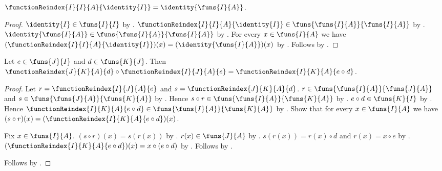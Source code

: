 \begin{theorem}\label{function_reindex_identity}
    $\functionReindex{I}{I}{A}{\identity{I}}=\identity{\funs{I}{A}}$.
\end{theorem}
\begin{proof}
    $\identity{I}\in\funs{I}{I}$ by .
    $\functionReindex{I}{I}{A}{\identity{I}}\in\funs{\funs{I}{A}}{\funs{I}{A}}$
        by .
    $\identity{\funs{I}{A}}\in\funs{\funs{I}{A}}{\funs{I}{A}}$ by
        .
    For every $x\in\funs{I}{A}$ we have
        $(\functionReindex{I}{I}{A}{\identity{I}})(x)
            =(\identity{\funs{I}{A}})(x)$ by
        .
    Follows by .
\end{proof}

\begin{theorem}\label{function_reindex_composition}
    Let $e\in\funs{J}{I}$ and $d\in\funs{K}{J}$.
    Then $\functionReindex{J}{K}{A}{d}\circ\functionReindex{I}{J}{A}{e}
        =\functionReindex{I}{K}{A}{e\circ d}$.
\end{theorem}
\begin{proof}
    Let $r=\functionReindex{I}{J}{A}{e}$ and $s=\functionReindex{J}{K}{A}{d}$.
    $r\in\funs{\funs{I}{A}}{\funs{J}{A}}$ and
        $s\in\funs{\funs{J}{A}}{\funs{K}{A}}$ by .
    Hence $s\circ r\in\funs{\funs{I}{A}}{\funs{K}{A}}$ by .
    $e\circ d\in\funs{K}{I}$ by .
    Hence $\functionReindex{I}{K}{A}{e\circ d}\in
        \funs{\funs{I}{A}}{\funs{K}{A}}$ by .
    Show that for every $x\in\funs{I}{A}$ we have
        $(s\circ r)(x)=(\functionReindex{I}{K}{A}{e\circ d})(x)$.
    \begin{subproof}
        Fix $x\in\funs{I}{A}$.
        $(s\circ r)(x)=s(r(x))$ by
            .
        $r(x)\in\funs{J}{A}$ by .
        $s(r(x))=r(x)\circ d$ and $r(x)=x\circ e$ by
            .
        $(\functionReindex{I}{K}{A}{e\circ d})(x)=x\circ(e\circ d)$ by
            .
        Follows by .
    \end{subproof}
    Follows by .
\end{proof}

